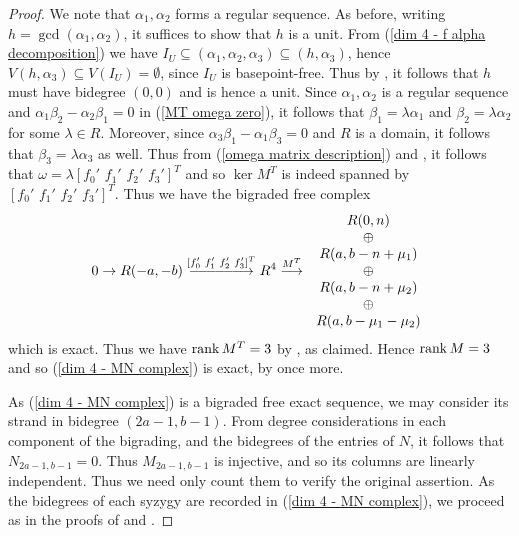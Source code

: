\documentclass[reqno]{amsart}
\numberwithin{equation}{section}
\theoremstyle{definition}
\def\rk{\mathop{\rm rank}}
\DeclareRobustCommand{\longestrightarrow}{
\DOTSB\relbar\joinrel\relbar\joinrel\relbar\joinrel\relbar\joinrel\relbar\joinrel\relbar\joinrel\rightarrow
}
\begin{document}
\begin{proof}
We note that $\alpha_1,\alpha_2$ forms a regular sequence. As before, writing $h=\gcd(\alpha_1,\alpha_2)$, it suffices to show that $h$ is a unit. From (\ref{dim 4 - f alpha decomposition}) we have $I_U\subseteq (\alpha_1,\alpha_2,\alpha_3) \subseteq (h,\alpha_3)$, hence $V(h,\alpha_3) \subseteq V(I_U) = \emptyset$, since $I_U$ is basepoint-free. Thus by , it follows that $h$ must have bidegree $(0,0)$ and is hence a unit. Since $\alpha_1, \alpha_2$ is a regular sequence and $\alpha_1\beta_2- \alpha_2\beta_1 =0$ in (\ref{MT omega zero}), it follows that $\beta_1 = \lambda\alpha_1$ and $\beta_2 = \lambda\alpha_2$ for some $\lambda\in R$. Moreover, since $\alpha_3\beta_1 - \alpha_1\beta_3=0$ and $R$ is a domain, it follows that $\beta_3= \lambda\alpha_3$ as well. Thus from (\ref{omega matrix description}) and , it follows that $\omega = \lambda[f_0'\,\,f_1'\,\,f_2'\,\,f_3']^T$ and so $\ker M^T$ is indeed spanned by $[f_0'\,\,f_1'\,\,f_2'\,\,f_3']^T$. Thus we have the bigraded free complex
\begin{equation}\label{M^T complex}
 0 \rightarrow R(-a,-b) \overset{[f_0'\,\,f_1'\,\,f_2'\,\,f_3']^T}{\longestrightarrow}
 R^4 \overset{M^T}{\longrightarrow} \,
\begin{array}{c}
 R(0,n)\\
 \oplus \\
R(a,b-n+\mu_1)\\
 \oplus \\
R(a,b-n+\mu_2)\\
\oplus\\
R(a,b-\mu_1-\mu_2)
\end{array}
\end{equation}
which is exact. Thus we have $\rk M^T=3$ by \cite[Cor. 1]{BE73}, as claimed. Hence $\rk M=3$ and so (\ref{dim 4 - MN complex}) is exact, by \cite[Cor. 1]{BE73} once more.



As (\ref{dim 4 - MN complex}) is a bigraded free exact sequence, we may consider its strand in bidegree $(2a-1,b-1)$. From degree considerations in each component of the bigrading, and the bidegrees of the entries of $N$, it follows that $N_{2a-1,b-1} =0$. Thus $M_{2a-1,b-1}$ is injective, and so its columns are linearly independent. Thus we need only count them to verify the original assertion. As the bidegrees of each syzygy are recorded in (\ref{dim 4 - MN complex}), we proceed as in the proofs of  and . 




\end{proof}
\end{document}
